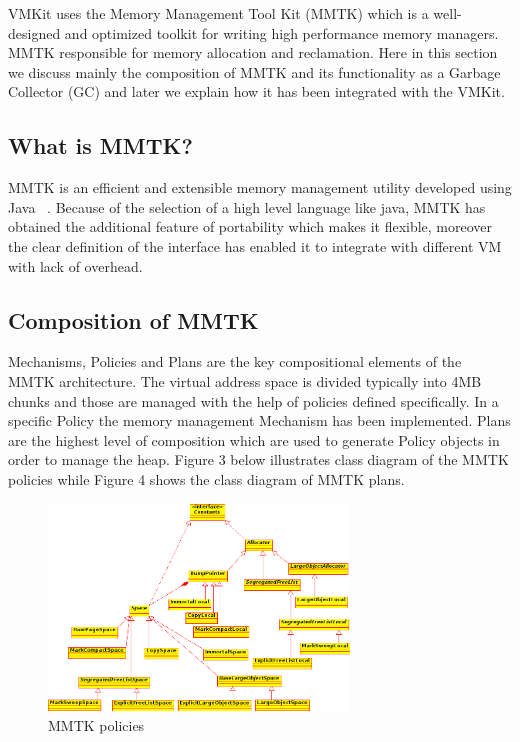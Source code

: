 \label{sec:mmtk}

VMKit uses the Memory Management Tool Kit (MMTK) which is a well-designed and optimized toolkit for writing high performance memory managers. MMTK responsible for memory allocation and reclamation. Here in this section we discuss mainly the composition of MMTK and its functionality as a Garbage Collector (GC) and later we explain how it has been integrated with the VMKit.\\
\subsection{What is MMTK?}
MMTK is an efficient and extensible memory management utility developed using Java ~\cite{mmtk}. Because of the selection of a high level language like java, MMTK has obtained the additional feature of portability which makes it flexible, moreover the clear definition of the interface has enabled it to integrate with different VM with lack of overhead. 
\subsection{Composition of MMTK}
Mechanisms, Policies and Plans are the key compositional elements of the MMTK architecture. The virtual address space is divided typically into 4MB chunks and those are managed with the help of policies defined specifically. In a specific Policy the memory management Mechanism has been implemented. Plans are the highest level of composition which are used to generate Policy objects in order to manage the heap. Figure 3 below illustrates class diagram of the MMTK policies while Figure 4 shows the class diagram of MMTK plans.

\begin{figure}[ht!]
\centering
\includegraphics[width=80mm]{Policies.png}
\caption{MMTK policies}
\label{fig:mmtk}
\end{figure}

